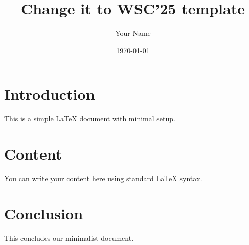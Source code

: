 \documentclass{article}
\begin{document}
\title{Change it to WSC'25 template}
\author{Your Name}
\date{\today}

\maketitle

\section{Introduction}
This is a simple LaTeX document with minimal setup.

\section{Content}
You can write your content here using standard LaTeX syntax.

\section{Conclusion}
This concludes our minimalist document.
\end{document}
